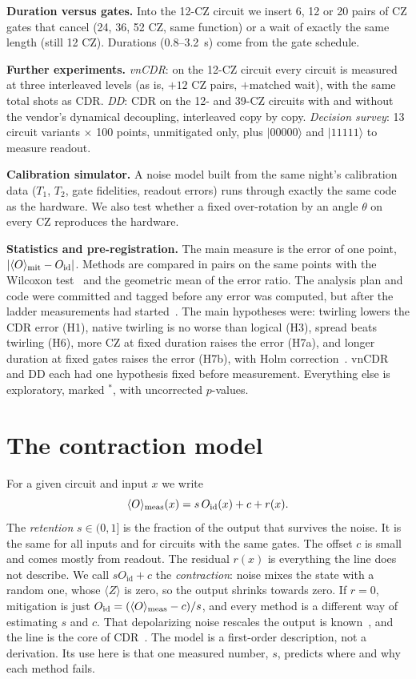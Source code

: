 \documentclass[aps,pra,twocolumn,superscriptaddress,nofootinbib,10pt]{revtex4-2}
\newcommand{\ev}[1]{\langle #1\rangle}
\newcommand{\ket}[1]{|#1\rangle}
\newcommand{\Oid}{O_{\mathrm{id}}}
\newcommand{\ex}{$^{*}$}
\begin{document}
\textbf{Duration versus gates.} Into the 12-CZ circuit we insert 6, 12 or 20 pairs of CZ
gates that cancel (24, 36, 52 CZ, same function) or a wait of exactly the same length (still
12 CZ). Durations (0.8--3.2~\textmu s) come from the gate schedule.

\textbf{Further experiments.} \emph{vnCDR}: on the 12-CZ circuit every circuit is measured at
three interleaved levels (as is, $+12$ CZ pairs, $+$matched wait), with the same total shots
as CDR. \emph{DD}: CDR on the 12- and 39-CZ circuits with and without the vendor's dynamical
decoupling, interleaved copy by copy. \emph{Decision survey}: 13 circuit variants $\times$
100 points, unmitigated only, plus $\ket{00000}$ and $\ket{11111}$ to measure readout.

\textbf{Calibration simulator.} A noise model built from the same night's calibration data
($T_1$, $T_2$, gate fidelities, readout errors) runs through exactly the same code as the
hardware. We also test whether a fixed over-rotation by an angle $\theta$ on every CZ
reproduces the hardware.

\textbf{Statistics and pre-registration.} The main measure is the error of one point,
$|\ev{O}_{\rm mit}-\Oid|$. Methods are compared in pairs on the same points with the Wilcoxon
test~\cite{wilcoxon1945} and the geometric mean of the error ratio. The analysis plan and code
were committed and tagged before any error was computed, but after the ladder measurements had
started~\cite{nosek2018}. The main hypotheses were: twirling lowers the CDR error (H1), native
twirling is no worse than logical (H3), spread beats twirling (H6), more CZ at fixed duration
raises the error (H7a), and longer duration at fixed gates raises the error (H7b), with Holm
correction~\cite{holm1979}. vnCDR and DD each had one hypothesis fixed before measurement.
Everything else is exploratory, marked \ex, with uncorrected $p$-values.

\section{The contraction model}

For a given circuit and input $x$ we write
\begin{equation}
\ev{O}_{\rm meas}(x)= s\,\Oid(x)+c+r(x). \label{eq:model}
\end{equation}
The \emph{retention} $s\in(0,1]$ is the fraction of the output that survives the noise. It is
the same for all inputs and for circuits with the same gates. The offset $c$ is small and comes
mostly from readout. The residual $r(x)$ is everything the line does not describe. We call
$s\Oid+c$ the \emph{contraction}: noise mixes the state with a random one, whose $\ev{Z}$ is
zero, so the output shrinks towards zero. If $r=0$, mitigation is just
$\Oid=(\ev{O}_{\rm meas}-c)/s$, and every method is a different way of estimating $s$ and $c$.
That depolarizing noise rescales the output is known~\cite{vovrosh2021,urbanek2021}, and the
line is the core of CDR~\cite{czarnik2021}. The model is a first-order description, not a
derivation. Its use here is that one measured number, $s$, predicts where and why each method
fails.
\end{document}

